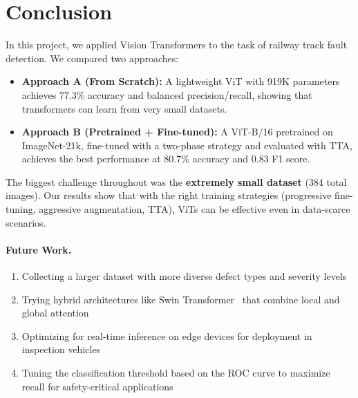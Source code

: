 \documentclass[10pt,twocolumn,letterpaper]{article}
\begin{document}
\section{Conclusion}

In this project, we applied Vision Transformers to the task of railway track fault detection. We compared two approaches:

\begin{itemize}[leftmargin=*, itemsep=2pt]
    \item \textbf{Approach A (From Scratch):} A lightweight ViT with 919K parameters achieves 77.3\% accuracy and balanced precision/recall, showing that transformers can learn from very small datasets.
    \item \textbf{Approach B (Pretrained + Fine-tuned):} A ViT-B/16 pretrained on ImageNet-21k, fine-tuned with a two-phase strategy and evaluated with TTA, achieves the best performance at 80.7\% accuracy and 0.83 F1 score.
\end{itemize}

The biggest challenge throughout was the \textbf{extremely small dataset} (384 total images). Our results show that with the right training strategies (progressive fine-tuning, aggressive augmentation, TTA), ViTs can be effective even in data-scarce scenarios.

\paragraph{Future Work.}
\begin{enumerate}[leftmargin=*, itemsep=2pt]
    \item Collecting a larger dataset with more diverse defect types and severity levels
    \item Trying hybrid architectures like Swin Transformer~\cite{Liu2021} that combine local and global attention
    \item Optimizing for real-time inference on edge devices for deployment in inspection vehicles
    \item Tuning the classification threshold based on the ROC curve to maximize recall for safety-critical applications
\end{enumerate}
\end{document}
